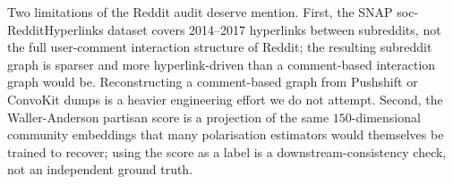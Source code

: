 Two limitations of the Reddit audit deserve mention. First, the SNAP
soc-RedditHyperlinks dataset covers 2014--2017 hyperlinks between
subreddits, not the full user-comment interaction structure of
Reddit; the resulting subreddit graph is sparser and more
hyperlink-driven than a comment-based interaction graph would be.
Reconstructing a comment-based graph from Pushshift or ConvoKit
dumps is a heavier engineering effort we do not attempt. Second, the
Waller-Anderson partisan score is a projection of the same
$150$-dimensional community embeddings that many polarisation
estimators would themselves be trained to recover; using the score
as a label is a downstream-consistency check, not an independent
ground truth.
